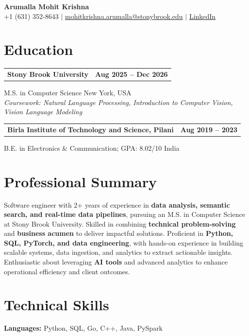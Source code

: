 \documentclass[letterpaper,10pt]{article}
\makeatletter
\newcommand{\entry}[2]{%
  \noindent
  \begin{tabularx}{\linewidth}
    {@{}>{\raggedright\arraybackslash}X@{\hspace{6pt}}r@{}}
    \textbf{#1} & #2
  \end{tabularx}\par
}
\makeatother
\begin{document}
\begin{center}
    {\LARGE\bfseries Arumalla Mohit Krishna}\\[3pt]
    +1 (631) 352-8643 $|$
    \href{mailto:mohitkrishna.arumalla@stonybrook.edu}
    {mohitkrishna.arumalla@stonybrook.edu} $|$
    \href{https://linkedin.com/in/mohit-krishna-arumalla}
    {LinkedIn}
\end{center}
\vspace{-8pt}

\section{Education}

\entry
  {\textbf{Stony Brook University}}
  {\textbf{Aug 2025 -- Dec 2026}}

M.S. in Computer Science \hfill New York, USA\\
\textit{
Coursework: Natural Language Processing,
Introduction to Computer Vision, Vision Language Modeling
}
\vspace{3pt}

\entry
  {\textbf{Birla Institute of Technology and Science, Pilani}}
  {\textbf{Aug 2019 -- 2023}}

B.E. in Electronics \& Communication; GPA: 8.02/10 \hfill India
\section{Professional Summary}

Software engineer with 2+ years of experience in \textbf{data analysis, semantic search, and real-time data pipelines}, pursuing an M.S. in Computer Science at Stony Brook University. Skilled in combining \textbf{technical problem-solving} and \textbf{business acumen} to deliver impactful solutions. Proficient in \textbf{Python, SQL, PyTorch, and data engineering}, with hands-on experience in building scalable systems, data ingestion, and analytics to extract actionable insights. Enthusiastic about leveraging \textbf{AI tools} and advanced analytics to enhance operational efficiency and client outcomes.
\section{Technical Skills}

\textbf{Languages:}
Python, SQL, Go, C++, Java, PySpark \\
\end{document}
